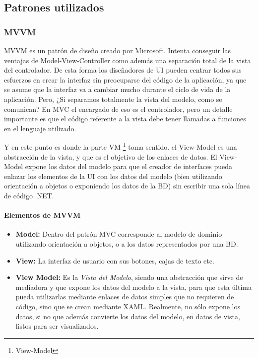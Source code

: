 \subsection{Patrones utilizados}

\subsubsection{MVVM}
MVVM es un patr\'{o}n de dise\~{n}o creado por Microsoft. Intenta conseguir las ventajas de Model-View-Controller como adem\'as una separaci\'{o}n total
de la vista del controlador. De esta forma los dise\~{n}adores de UI pueden centrar todos sus esfuerzos en crear la interfaz sin preocuparse 
del c\'{o}digo de la aplicaci\'{o}n, ya que se asume que la interfaz va a cambiar mucho durante el ciclo de vida de la aplicaci\'{o}n. Pero,
¿Si separamos totalmente la vista del modelo, como se comunican? En MVC el encargado de eso es el controlador, pero un detalle importante es 
que el c\'{o}digo referente a la vista debe tener llamadas a funciones en el lenguaje utilizado.

Y en este punto es donde la parte VM \footnote{View-Model} toma sentido. el View-Model es una abstracci\'{o}n de la vista, y que es el objetivo 
de los enlaces de datos. El View-Model expone los datos del modelo para que el creador de interfaces pueda enlazar los elementos de la UI
con los datos del modelo (bien utilizando orientaci\'{o}n a objetos o exponiendo los datos de la BD) sin escribir una sola l\'{i}nea de 
c\'{o}digo .NET.

\paragraph{Elementos de MVVM}

\begin{itemize}
    \item \textbf{Model:} Dentro del patr\'{o}n MVC corresponde al modelo de dominio utilizando orientaci\'{o}n a objetos, o a los datos
    representados por una BD.
    \item \textbf{View:} La interfaz de usuario con sus botones, cajas de texto etc.
    \item \textbf{View Model:} Es la \emph{Vista del Modelo}, siendo una abstracci\'{o}n que sirve de mediadora y que expone los datos
    del modelo a la vista, para que esta \'{u}ltima pueda utilizarlas mediante enlaces de datos simples que no requieren de c\'{o}digo, sino
    que se crean mediante XAML. Realmente, no s\'{o}lo expone los datos, si no que adem\'as convierte los datos del modelo, en datos de vista, listos
    para ser visualizados.
\end{itemize}

